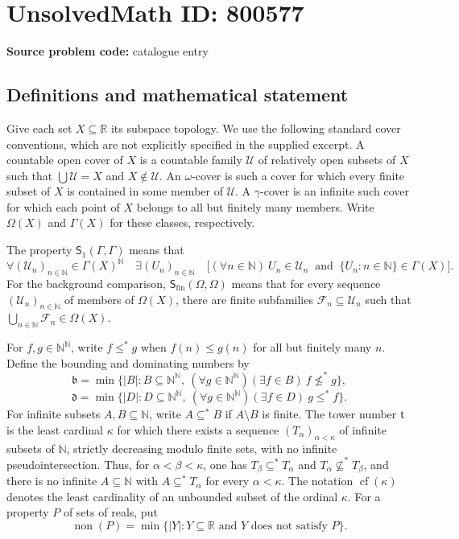 \documentclass[11pt]{article}
\newcommand{\N}{\mathbb{N}}
\newcommand{\R}{\mathbb{R}}
\begin{document}
\section*{UnsolvedMath ID: 800577}
\textbf{Source problem code:} catalogue entry
\subsection{Definitions and mathematical statement}
Give each set \(X\subseteq\R\) its subspace topology. We use the following standard cover conventions, which are not explicitly specified in the supplied excerpt. A countable open cover of \(X\) is a countable family \(\mathcal U\) of relatively open subsets of \(X\) such that \(\bigcup\mathcal U=X\) and \(X\notin\mathcal U\). An \(\omega\)-cover is such a cover for which every finite subset of \(X\) is contained in some member of \(\mathcal U\). A \(\gamma\)-cover is an infinite such cover for which each point of \(X\) belongs to all but finitely many members. Write \(\Omega(X)\) and \(\Gamma(X)\) for these classes, respectively.

The property \(\mathsf S_1(\Gamma,\Gamma)\) means that
\[
\forall (\mathcal U_n)_{n\in\N}\in\Gamma(X)^{\N}\quad
\exists (U_n)_{n\in\N}\quad
\bigl[(\forall n\in\N)\ U_n\in\mathcal U_n
\ \text{ and }\ \{U_n:n\in\N\}\in\Gamma(X)\bigr].
\]
For the background comparison, \(\mathsf S_{\mathrm{fin}}(\Omega,\Omega)\) means that for every sequence \((\mathcal U_n)_{n\in\N}\) of members of \(\Omega(X)\), there are finite subfamilies \(\mathcal F_n\subseteq\mathcal U_n\) such that \(\bigcup_{n\in\N}\mathcal F_n\in\Omega(X)\).

For \(f,g\in\N^{\N}\), write \(f\leq^*g\) when \(f(n)\leq g(n)\) for all but finitely many \(n\). Define the bounding and dominating numbers by
\[
\mathfrak b=\min\bigl\{|B|:B\subseteq\N^{\N},\ (\forall g\in\N^{\N})(\exists f\in B)\ f\not\leq^*g\bigr\},
\]
\[
\mathfrak d=\min\bigl\{|D|:D\subseteq\N^{\N},\ (\forall g\in\N^{\N})(\exists f\in D)\ g\leq^*f\bigr\}.
\]
For infinite subsets \(A,B\subseteq\N\), write \(A\subseteq^*B\) if \(A\setminus B\) is finite. The tower number \(\mathfrak t\) is the least cardinal \(\kappa\) for which there exists a sequence \((T_\alpha)_{\alpha<\kappa}\) of infinite subsets of \(\N\), strictly decreasing modulo finite sets, with no infinite pseudointersection. Thus, for \(\alpha<\beta<\kappa\), one has \(T_\beta\subseteq^*T_\alpha\) and \(T_\alpha\not\subseteq^*T_\beta\), and there is no infinite \(A\subseteq\N\) with \(A\subseteq^*T_\alpha\) for every \(\alpha<\kappa\). The notation \(\operatorname{cf}(\kappa)\) denotes the least cardinality of an unbounded subset of the ordinal \(\kappa\). For a property \(P\) of sets of reals, put
\[
\operatorname{non}(P)=\min\{|Y|:Y\subseteq\R\text{ and }Y\text{ does not satisfy }P\}.
\]
\end{document}
